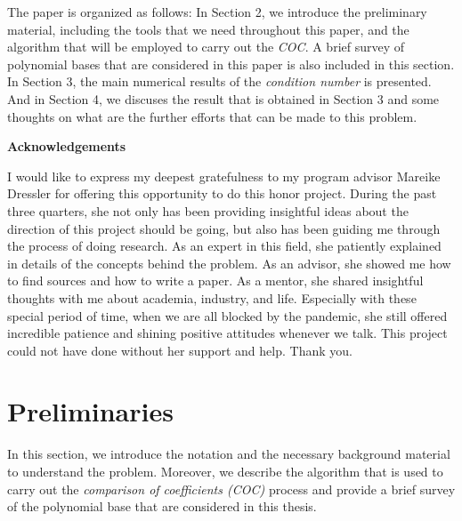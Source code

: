 \documentclass[12pt]{amsart}
\numberwithin{equation}{section}
\theoremstyle{definition}
\numberwithin{thm}{section}
\begin{document}
The paper is organized as follows: In Section 2, we introduce the preliminary material, 
including the tools that we need throughout this paper, and the algorithm that will be employed to carry out the \emph{COC}.
A brief survey of polynomial bases that are considered in this paper is also included in this section. 
In Section 3, the main numerical results of the \emph{condition number} is presented. 
And in Section 4, we discuses the result that is obtained in Section 3 and some thoughts on what are the further efforts that can be made to this problem.



\newpage

\centerline{\textbf{Acknowledgements}}

I would like to express my deepest gratefulness to my program advisor Mareike Dressler for offering this opportunity to do this honor project. 
During the past three quarters, she not only has been providing insightful ideas about the direction of this project should be going, 
but also has been guiding me through the process of doing research. 
As an expert in this field, she patiently explained in details of the concepts behind the problem.
As an advisor, she showed me how to find sources and how to write a paper. 
As a mentor, she shared insightful thoughts with me about academia, industry, and life.
Especially with these special period of time, when we are all blocked by the pandemic, 
she still offered incredible patience and shining positive attitudes whenever we talk. 
This project could not have done without her support and help. 
Thank you.

\newpage

\section{Preliminaries}
\label{Sec:Preliminaries}

In this section, we introduce the notation and the necessary background material
to understand the problem. 
Moreover, we describe the algorithm that is used to carry out the \emph{comparison of coefficients (COC)}
process and provide a brief survey of the polynomial base that are considered in this thesis.

\end{document}
